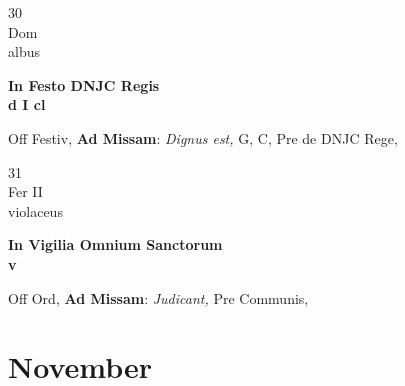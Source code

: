 \documentclass[10pt, openany]{book}
\begin{document}
        \begin{center}
            \begin{minipage}{3.5in}
                \vspace{2em}
                \begin{minipage}{0.5in}
                    {\Huge 30} \\
                    {\normalsize Dom} \\
                    {\normalsize albus}
                \end{minipage}
                \begin{minipage}{3.0in}
                    \textbf{ \large In Festo DNJC Regis \\
                    \textnormal{\normalsize d I cl}} \\ 
                \end{minipage}
                \begin{justify}Off Festiv, \textbf{Ad Missam}: \textit{Dignus est,} G, C, Pre de DNJC Rege,  
                \end{justify}
            \end{minipage}
        \end{center}
    
        \begin{center}
            \begin{minipage}{3.5in}
                \vspace{2em}
                \begin{minipage}{0.5in}
                    {\Huge 31} \\
                    {\normalsize Fer II} \\
                    {\normalsize violaceus}
                \end{minipage}
                \begin{minipage}{3.0in}
                    \textbf{ \large In Vigilia Omnium Sanctorum \\
                    \textnormal{\normalsize v}} \\ 
                \end{minipage}
                \begin{justify}Off Ord, \textbf{Ad Missam}: \textit{Judicant,} Pre Communis,  
                \end{justify}
            \end{minipage}
        \end{center}
    
        \chapter{November}
                        
\end{document}
